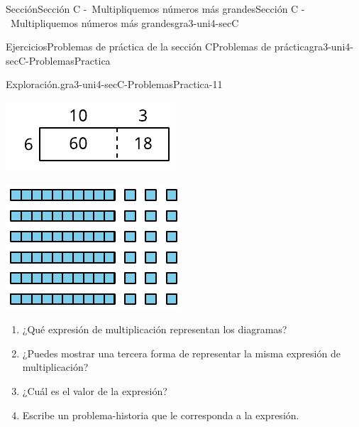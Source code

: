\documentclass[twoside,10pt,]{article}
\begin{document}
\begin{sectionptx}{Sección}{Sección C -~Multipliquemos números más grandes}{}{Sección C -~Multipliquemos números más grandes}{}{}{gra3-uni4-secC}
\begin{exercises-subsection}{Ejercicios}{Problemas de práctica de la sección C}{}{Problemas de práctica}{}{}{gra3-uni4-secC-ProblemasPractica}
\begin{divisionexercise}{9}{Exploración.}{}{gra3-uni4-secC-ProblemasPractica-11}
\begin{sidebyside}{2}{0.025}{0.025}{0.05}%
\begin{sbspanel}{0.45}%
\includegraphics[width=\linewidth]{external/svg-source/tikz-file-151680-scale13.pdf}
\end{sbspanel}%
\begin{sbspanel}{0.45}%
\includegraphics[width=\linewidth]{external/svg-source/tikz-file-151681-scale13.pdf}
\end{sbspanel}%
\end{sidebyside}%
%
\begin{enumerate}[label={(\alph*)}]
\item{}¿Qué expresión de multiplicación representan los diagramas?%
\item{}¿Puedes mostrar una tercera forma de representar la misma expresión de multiplicación?%
\item{}¿Cuál es el valor de la expresión?%
\item{}Escribe un problema-historia que le corresponda a la expresión.%
\end{enumerate}
\end{divisionexercise}%

\end{exercises-subsection}
\end{sectionptx}
\end{document}

